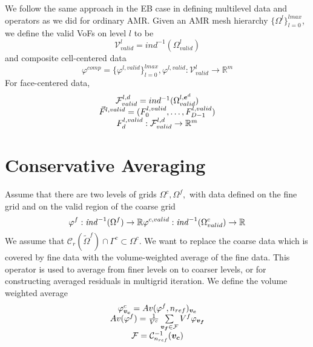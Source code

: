 We follow the same approach in the EB case in defining multilevel data
and operators as we did for ordinary AMR. Given an AMR mesh hierarchy
$\{ \Omega^l \}^{lmax}_{l=0}$, we define the valid VoFs on level $l$ to be 
\begin{equation}
\mathcal{V}^l_{valid} = ind^{-1}(\Omega^l_{valid})
\end{equation}
and composite cell-centered data
\begin{equation}
\varphi^{comp} = \{ \varphi^{l, valid} \}^{lmax}_{l=0}, 
\varphi^{l,valid} : \mathcal{V}^l_{valid} \rightarrow \mathbb{R}^m
\end{equation}
For face-centered data,
\begin{equation}
\begin{array}{c}
\mathcal{F}^{l, d}_{valid} = ind^{-1}(\Omega^{l, {\boldsymbol{e}}^d}_{valid}) \\
\vec{F}^{l, valid} = (F^{l, valid}_0, \ldots, F^{l, valid}_{D-1}) \\
F^{l, valid}_d : \mathcal{F}^{l, d}_{valid} \rightarrow \mathbb{R}^m
\end{array}
\end{equation}

\section{Conservative Averaging}

Assume that there are two levels of grids $\Omega^c, \Omega^f,$ with
data defined on the fine grid and on the valid region of the coarse
grid 
\begin{equation}
\varphi^f : {\it ind}^{-1}(\Omega^f) \rightarrow \mathbb{R} \\
\varphi^{c, valid} : {\it ind}^{-1}(\Omega^c_{valid}) \rightarrow \mathbb{R}
\end{equation}
We assume that $\mathcal{C}_r(\tilde{\Omega}^f) \cap \Gamma^c \subset
\Omega^c$.   We want to replace the coarse data which is covered
by fine data with the volume-weighted average of the fine data.
This operator is used to average
from finer levels on to coarser levels, or for constructing averaged
residuals in multigrid iteration.  We define the volume weighted average
\begin{equation}
\begin{array}{c}
\varphi^c_{{\boldsymbol{v_c}}} = Av(\varphi^f, n_{ref})_{{\boldsymbol{v_c}}}  \\
Av(\varphi^f)= \frac{1}{V^c} \sum\limits_{{{\boldsymbol{v_f}}} \in {\cal F}} V^f
\varphi_{{\boldsymbol{v_f}}} \\
{\cal F} =  \mathcal{C}^{-1}_{n_{ref}}({\boldsymbol{v_c}})
 \end{array}
\label{eqn::coarseaverage}
\end{equation}

